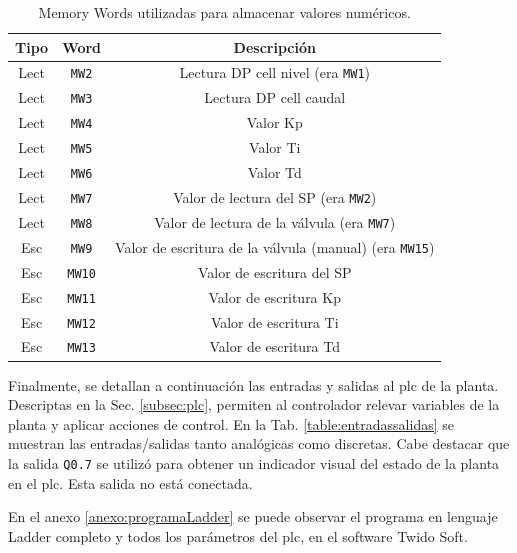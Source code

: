 \begin{table}[!t]

\renewcommand{\arraystretch}{1.3}
\centering
\begin{tabular}{c||c||c}
\hline
\bfseries Tipo & \bfseries Word  & \bfseries Descripción\\
\hline \hline
Lect & \verb|MW2|  & Lectura DP cell nivel (era \verb|MW1|)\\
Lect & \verb|MW3|  & Lectura DP cell caudal\\
Lect & \verb|MW4|  & Valor Kp\\
Lect & \verb|MW5|  & Valor Ti\\
Lect & \verb|MW6|  & Valor Td\\
Lect & \verb|MW7|  & Valor de lectura del SP (era \verb|MW2|)\\
Lect & \verb|MW8|  & Valor de lectura de la válvula (era \verb|MW7|)\\
\hline
Esc & \verb|MW9| & Valor de escritura de la válvula (manual) (era 
\verb|MW15|) \\
Esc & \verb|MW10|  & Valor de escritura del SP \\
Esc & \verb|MW11|  & Valor de escritura Kp \\
Esc & \verb|MW12|  & Valor de escritura Ti \\
Esc & \verb|MW13| & Valor de escritura Td \\
\hline
\end{tabular}
\caption{Memory Words utilizadas para almacenar valores numéricos.}
\label{table:mwNumericos}
\end{table}

Finalmente, se detallan a continuación las entradas y salidas al \gls{plc} de 
la planta.
Descriptas en la Sec. \ref{subsec:plc}, permiten al
controlador relevar variables de la planta y aplicar acciones de control. 
En la Tab. \ref{table:entradassalidas} se muestran las
entradas/salidas tanto analógicas como discretas.
Cabe destacar que la salida \verb|Q0.7| se utilizó para obtener un indicador
visual del estado de la planta en el plc.
Esta salida no está conectada.

En el anexo \ref{anexo:programaLadder} se puede
observar el programa en
lenguaje Ladder completo y todos los parámetros del \gls{plc}, en el
software Twido Soft.

